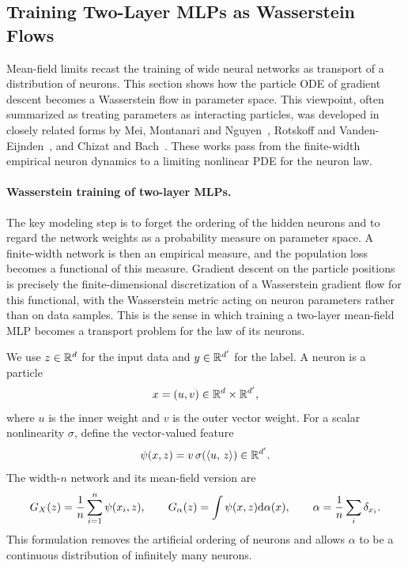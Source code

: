 \subsection{Training Two-Layer MLPs as Wasserstein Flows}
\label{sec-wasserstein-flows-mlp}

Mean-field limits recast the training of wide neural networks as transport of a distribution of neurons. This section shows how the particle ODE of gradient descent becomes a Wasserstein flow in parameter space. This viewpoint, often summarized as treating parameters as interacting particles, was developed in closely related forms by Mei, Montanari and Nguyen~\citep{MeiMontanariNguyen2018MeanFieldNN}, Rotskoff and Vanden-Eijnden~\citep{RotskoffVandenEijnden2018Trainability}, and Chizat and Bach~\citep{ChizatBach2018OverparameterizedOT}. These works pass from the finite-width empirical neuron dynamics to a limiting nonlinear PDE for the neuron law.

\paragraph{Wasserstein training of two-layer MLPs.}
The key modeling step is to forget the ordering of the hidden neurons and to regard the network weights as a probability measure on parameter space. A finite-width network is then an empirical measure, and the population loss becomes a functional of this measure. Gradient descent on the particle positions is precisely the finite-dimensional discretization of a Wasserstein gradient flow for this functional, with the Wasserstein metric acting on neuron parameters rather than on data samples. This is the sense in which training a two-layer mean-field MLP becomes a transport problem for the law of its neurons.

We use $z\in\mathbb{R}^d$ for the input data and $y\in\mathbb{R}^{d'}$ for the label. A neuron is a particle
\[
	x=(u,v)\in\mathbb{R}^d\times\mathbb{R}^{d'},
\]
where $u$ is the inner weight and $v$ is the outer vector weight. For a scalar nonlinearity $\sigma$, define the vector-valued feature
\[
	\psi(x,z)=v\,\sigma(\langle u,\,z\rangle)\in\mathbb{R}^{d'}.
\]
The width-$n$ network and its mean-field version are
\[
	G_X(z)=\frac1n\sum_{i=1}^n\psi(x_i,z),
	\qquad
	G_\alpha(z)=\int\psi(x,z)\mathrm{d}\alpha(x),
	\qquad
	\alpha=\frac1n\sum_i\delta_{x_i}.
\]
This formulation removes the artificial ordering of neurons and allows $\alpha$ to be a continuous distribution of infinitely many neurons.

